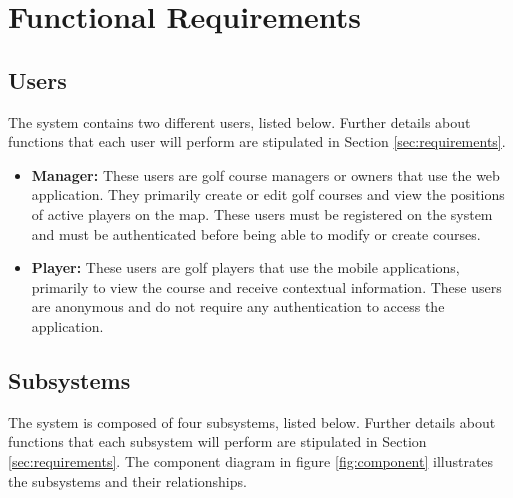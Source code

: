 \documentclass{article}
\begin{document}
    \newpage


    \section{Functional Requirements} 

    \subsection{Users}

    The system contains two different users, listed below. Further details
    about functions that each user will perform are stipulated in Section
    \ref{sec:requirements}.

    \begin{itemize}
        \item \textbf{Manager:} These users are golf course managers or owners
            that use the web application. They primarily create or edit golf
            courses and view the positions of active players on the map. These
            users must be registered on the system and must be authenticated
            before being able to modify or create courses.
        \item \textbf{Player:} These users are golf players that use the mobile
            applications, primarily to view the course and receive contextual
            information. These users are anonymous and do not require any
            authentication to access the application.
    \end{itemize}

    \subsection{Subsystems}

    The system is composed of four subsystems, listed below. Further details
    about functions that each subsystem will perform are stipulated in Section
    \ref{sec:requirements}. The component diagram in figure \ref{fig:component}
    illustrates the subsystems and their relationships.
\end{document}
